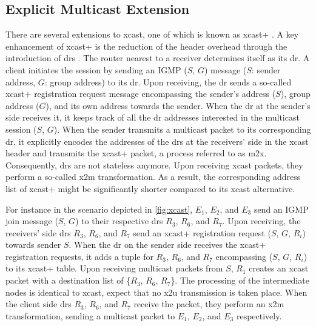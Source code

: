 \subsection{Explicit Multicast Extension} %
\label{sub:Explicit Multicast Extension}
There are several extensions to \gls{xcast}, one of which is known as
    \gls{xcast+} \cite{xcast+}.
A key enhancement of \gls{xcast+} is the reduction of the header overhead
    through the introduction of \glspl{dr} \cite{xcast+}.
The router nearest to a receiver determines itself as its \gls{dr}.
A client initiates the session by sending an IGMP ($S$, $G$) message ($S$:
    sender address, $G$: group address) to its \gls{dr}.
Upon receiving, the \gls{dr} sends a so-called \gls{xcast+} registration
    request message encompassing the sender's address ($S$), group address
    ($G$), and its own address towards the sender.
When the \gls{dr} at the sender's side receives it, it keeps track of all the
    \gls{dr} addresses interested in the multicast session ($S$, $G$).
When the sender transmits a multicast packet to its corresponding \gls{dr},
    it explicitly encodes the addresses of the \glspl{dr} at the receivers'
    side in the \gls{xcast} header and transmits the \gls{xcast+} packet, a
    process referred to as \gls{m2x}.
Consequently, \glspl{dr} are not stateless anymore.
Upon receiving \gls{xcast} packets, they perform a so-called \gls{x2m}
    transformation.
As a result, the corresponding address list of \gls{xcast+} might be
    significantly shorter compared to its \gls{xcast} alternative.

For instance in the scenario depicted in \autoref{fig:xcast}, $E_1$, $E_2$, and
    $E_3$ send an IGMP join message ($S$, $G$) to their respective \glspl{dr}
    $R_3$, $R_6$, and $R_7$.
Upon receiving, the receivers' side \glspl{dr} $R_3$, $R_6$, and $R_7$ send an
    \gls{xcast+} registration request ($S$, $G$, $R_i$) towards sender $S$.
When the \gls{dr} on the sender side receives the \gls{xcast+} registration
    requests, it adds a tuple for $R_3$, $R_6$, and $R_7$ encompassing ($S$,
    $G$, $R_i$) to its \gls{xcast+} table.
Upon receiving multicast packets from $S$, $R_1$ creates an \gls{xcast} packet
    with a destination list of \{$R_3$, $R_6$, $R_7$\}.
The processing of the intermediate nodes is identical to \gls{xcast}, expect 
    that no \gls{x2u} transmission is taken place.
When the client side \glspl{dr} $R_3$, $R_6$, and $R_7$ receive the packet, 
    they perform an \gls{x2m} transformation, sending a multicast packet to
    $E_1$, $E_2$, and $E_3$ respectively.


